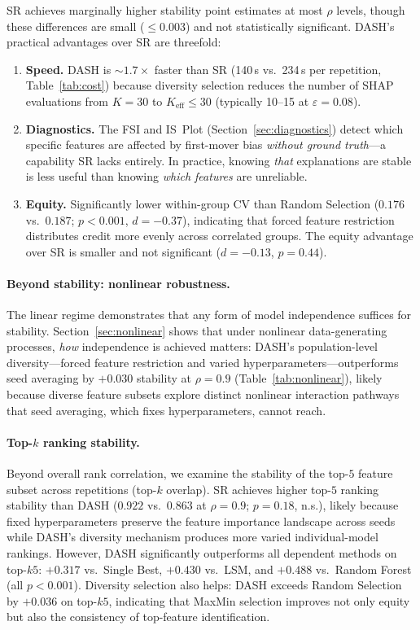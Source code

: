 \documentclass[10pt]{article}
\newcommand{\dash}{\textsc{DASH}}
\newcommand{\rhovar}{\rho}
\begin{document}
SR achieves marginally higher stability point estimates at most
$\rhovar$ levels, though these differences are small ($\leq 0.003$) and
not statistically significant.  \dash{}'s practical advantages over SR
are threefold:
\begin{enumerate}
  \item \textbf{Speed.} \dash{} is ${\sim}1.7\times$ faster than SR (140\,s
    vs.\ 234\,s per repetition, Table~\ref{tab:cost}) because diversity
    selection reduces the number of SHAP evaluations from $K = 30$ to
    $K_{\text{eff}} \leq 30$ (typically 10--15 at $\varepsilon = 0.08$).
  \item \textbf{Diagnostics.} The FSI and IS~Plot
    (Section~\ref{sec:diagnostics}) detect which specific features are
    affected by first-mover bias \emph{without ground truth}---a
    capability SR lacks entirely. In practice, knowing \emph{that}
    explanations are stable is less useful than knowing \emph{which
    features} are unreliable.
  \item \textbf{Equity.} Significantly lower within-group CV than
    Random Selection ($0.176$ vs.\ $0.187$; $p < 0.001$, $d = -0.37$),
    indicating that forced feature restriction distributes credit more
    evenly across correlated groups. The equity advantage over SR is
    smaller and not significant ($d = -0.13$, $p = 0.44$).
\end{enumerate}

\paragraph{Beyond stability: nonlinear robustness.}
The linear regime demonstrates that any form of model independence
suffices for stability. Section~\ref{sec:nonlinear} shows that under
nonlinear data-generating processes, \emph{how} independence is achieved
matters: \dash{}'s population-level diversity---forced feature restriction
and varied hyperparameters---outperforms seed averaging by $+0.030$
stability at $\rhovar = 0.9$ (Table~\ref{tab:nonlinear}), likely because
diverse feature subsets explore distinct nonlinear interaction pathways
that seed averaging, which fixes hyperparameters, cannot reach.

\paragraph{Top-$k$ ranking stability.}
Beyond overall rank correlation, we examine the stability of the top-$5$
feature subset across repetitions (top-$k$ overlap). SR achieves higher
top-$5$ ranking stability than \dash{} ($0.922$ vs.\ $0.863$ at
$\rhovar = 0.9$; $p = 0.18$, n.s.), likely because fixed hyperparameters
preserve the feature importance landscape across seeds while \dash{}'s
diversity mechanism produces more varied individual-model rankings.
However, \dash{} significantly outperforms all dependent methods on
top-$k5$: $+0.317$ vs.\ Single Best, $+0.430$ vs.\ LSM, and $+0.488$
vs.\ Random Forest (all $p < 0.001$). Diversity selection also helps:
\dash{} exceeds Random Selection by $+0.036$ on top-$k5$, indicating
that MaxMin selection improves not only equity but also the consistency
of top-feature identification.
\end{document}
